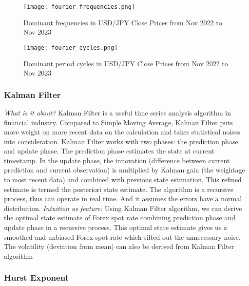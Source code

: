 \documentclass{article}
\begin{document}
\begin{figure}[h]
  \centering
  \texttt{[image: fourier\_frequencies.png]}
  \caption{Dominant frequencies in USD/JPY Close Prices from Nov 2022 to Nov 2023}
\end{figure}

\begin{figure}[h]
  \centering
  \texttt{[image: fourier\_cycles.png]}
  \caption{Dominant period cycles in USD/JPY Close Prices from Nov 2022 to Nov 2023}
\end{figure}
\newpage
\subsubsection{Kalman Filter}

\textit{What is it about?}
Kalman Filter is a useful time series analysis algorithm in financial industry. Compared to Simple Moving Average, Kalman Filter puts more weight on more recent data on the calculation and takes statistical noises into consideration.  
\newline
\newline
Kalman Filter works with two phases: the prediction phase and update phase. The prediction phase estimates the state at current timestamp. In the update phase, the innovation (difference between current prediction and current observation) is multiplied by Kalman gain (the weightage to most recent data) and combined with previous state estimation. This refined estimate is termed the posteriori state estimate.
\newline
\newline
The algorithm is a recursive process, thus can operate in real time. And it assumes the errors have a normal distribution. 
\newline
\newline
\textit{Intuition as feature:}
Using Kalman Filter algorithm, we can derive the optimal state estimate of Forex spot rate combining prediction phase and update phase in a recursive process. This optimal state estimate gives us a smoothed and unbiased Forex spot rate which sifted out the unnecessary noise. The volatility (deviation from mean) can also be derived from Kalman Filter algorithm  


\subsubsection{Hurst Exponent}
\end{document}
